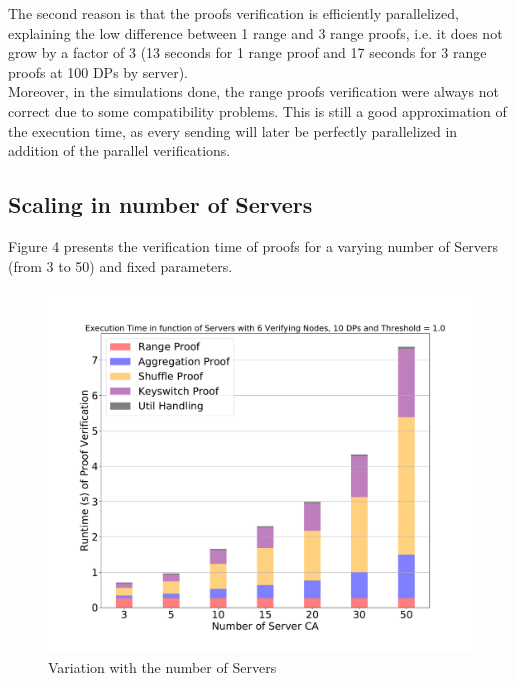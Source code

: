 \documentclass{article}
\begin{document}
The second reason is that the proofs verification is efficiently parallelized, explaining the low difference between 1 range and 3 range proofs, i.e. it does not grow by a factor of 3 (13 seconds for 1 range proof and 17 seconds for 3 range proofs at 100 DPs by server).\\
Moreover, in the simulations done, the range proofs verification were always not correct due to some compatibility problems. This is still a good approximation of the execution time, as every sending will later be perfectly parallelized in addition of the parallel verifications.

\subsection{Scaling in number of Servers}
Figure 4 presents the verification time of proofs for a varying number of Servers (from 3 to 50) and fixed parameters.

\begin{figure}[H]
\includegraphics[scale=0.5]{variationInServ}
\caption{Variation with the number of Servers}
\end{figure}
\end{document}
